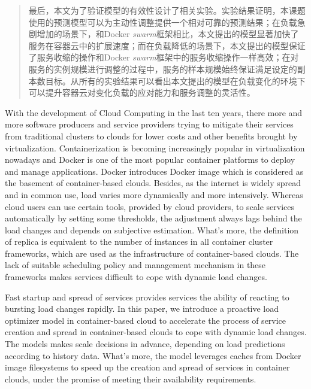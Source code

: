 \begin{abstract}
最后，本文为了验证模型的有效性设计了相关实验。实验结果证明，本课题使用的预测模型可以为主动性调整提供一个相对可靠的预测结果；在负载急剧增加的场景下，和Docker \emph{swarm}框架相比，本文提出的模型显著加快了服务在容器云中的扩展速度；而在负载降低的场景下，本文提出的模型保证了服务收缩的操作和Docker \emph{swarm}框架中的服务收缩操作一样高效；在对服务的实例规模进行调整的过程中，服务的样本规模始终保证满足设定的副本数目标。从所有的实验结果可以看出本文提出的模型在负载变化的环境下可以提升容器云对变化负载的应对能力和服务调整的灵活性。

\end{abstract}

\begin{englishabstract}
With the development of Cloud Computing in the last ten years, there more and more software producers and service providers trying to mitigate their services from traditional clusters to clouds for lower costs and other benefits brought by virtualization. Containerization is becoming increasingly popular in virtualization nowadays and Docker is one of the most popular container platforms to deploy and manage applications. Docker introduces Docker image which is considered as the basement of container-based clouds. Besides, as the internet is widely spread and in common use, load varies more dynamically and more intensively. Whereas cloud users can use certain tools, provided by cloud providers, to scale services automatically by setting some thresholds, the adjustment always lags behind the load changes and depends on subjective estimation. What's more, the definition of replica is equivalent to the number of instances in all container cluster frameworks, which are used as the infrastructure of container-based clouds. The lack of suitable scheduling policy and management mechanism in these frameworks makes services difficult to cope with dynamic load changes.

Fast startup and spread of services provides services the ability of reacting to bursting load changes rapidly. In this paper, we introduce a proactive load optimizer model in container-based cloud to accelerate the process of service creation and spread in container-based clouds to cope with dynamic load changes. The models makes scale decisions in advance, depending on load predictions according to history data. What's more, the model leverages caches from Docker image filesystems to speed up the creation and spread of services in container clouds, under the promise of meeting their availability requirements.


\end{englishabstract}

